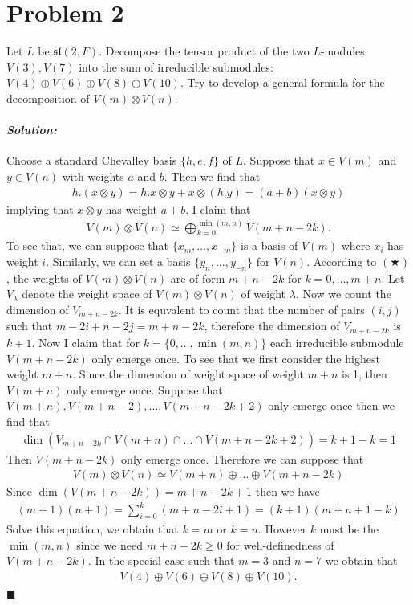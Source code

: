 \documentclass[12pt, a4paper]{article}
\newenvironment{solution}
  {\paragraph{\textit{Solution:}}\par\medskip}
  {\hfill$\blacksquare$\vspace{0.1cm}}
\begin{document}
\section*{Problem 2}
Let $L$ be $\mathfrak{sl}(2, F)$.
Decompose the tensor product of the two $L$-modules $V(3), V(7)$ into the sum of irreducible submodules: $V(4) \oplus V(6) \oplus V(8) \oplus V(10)$. Try to develop a general formula for the decomposition of $V(m) \otimes V(n)$.
\begin{solution}
  Choose a standard Chevalley basis $\{h,e,f\}$ of $L$. 
  Suppose that $x\in V(m)$ and $y\in V(n)$ with weights $a$ and $b$. Then we find that 
  \begin{align*}
    h.(x\otimes y) = h.x \otimes y+x\otimes(h.y)= (a+b)(x\otimes y) \tag{$\bigstar$}
  \end{align*}
  implying that $x\otimes y$ has weight $a+b$. I claim that 
  \begin{align*}
    V(m) \otimes V(n) \simeq \bigoplus_{k=0}^{\min(m,n)} V(m+n-2k).
  \end{align*}
  To see that, we can suppose that $\{x_{m},\dots,x_{-m}\}$ is a basis of $V(m)$ where $x_i$ has weight $i$. Similarly, we can set a basis $\{y_{n},\dots,y_{-n}\}$ for $V(n)$.
  According to $(\bigstar)$, the weights of $V(m)\otimes V(n)$ are of form $m+n-2k$ for $k=0,\dots,m+n$. 
  Let $V_{\lambda}$ denote the weight space of $V(m)\otimes V(n)$ of weight $\lambda$.
  Now we count the dimension of $V_{m+n-2k}$. It is equvalent to count that the number of pairs $(i,j)$ such that $m-2i+n-2j = m+n-2k$, therefore the dimension of $V_{m+n-2k}$ is $k+1$.
  Now I claim that for $k=\{0,\dots,\min(m,n)\}$ each irreducible submodule $V(m+n-2k)$ only emerge once.
  To see that we first consider the highest weight $m+n$. Since the dimension of weight space of weight $m+n$ is 1, then $V(m+n)$ only emerge once.
  Suppose that $V(m+n),V(m+n-2),\dots,V(m+n-2k+2)$ only emerge once then we find that 
  \begin{align*}
    \dim(V_{m+n-2k}\cap V(m+n)\cap\dots\cap V(m+n-2k+2)) = k+1-k=1
  \end{align*} 
  Then $V(m+n-2k)$ only emerge once. Therefore we can suppose that 
  \begin{align*}
     V(m) \otimes V(n) \simeq V(m+n)\oplus\dots \oplus V(m+n-2k)
  \end{align*}
  Since $\dim(V(m+n-2k)) = m+n-2k+1$ then we have 
  \begin{align*}
    (m+1)(n+1) = \sum_{i=0}^{k} (m+n-2i+1) = (k+1)(m+n+1-k)
  \end{align*}
  Solve this equation, we obtain that $k=m$ or $k=n$. 
  However $k$ must be the $\min(m,n)$ since we need $m+n-2k\ge 0$ for well-definedness of $V(m+n-2k)$.
  In the special case such that $m=3$ and $n=7$ we obtain that 
  \begin{align*}
    V(4) \oplus V(6) \oplus V(8) \oplus V(10).
  \end{align*}
\end{solution}
\end{document}
